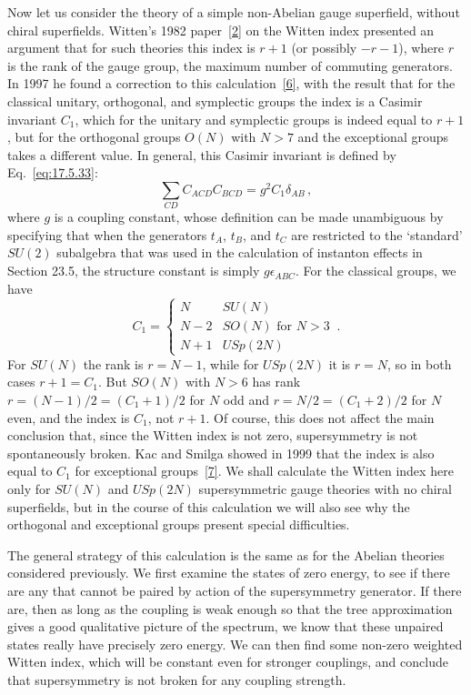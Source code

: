 Now let us consider the theory of a simple non-Abelian gauge superfield,
without chiral superfields. Witten's 1982
paper~\hyperref[ch29-ref-2]{[2]} on the Witten index presented an argument
that for such theories this index is \(r+1\) (or possibly \(-r-1\)), where
\(r\) is the rank of the gauge group, the maximum number of commuting
generators. In 1997 he found a correction to this
calculation~\hyperref[ch29-ref-6]{[6]}, with the result that for the
classical unitary, orthogonal, and symplectic groups the index is a Casimir
invariant \(C_1\), which for the unitary and symplectic groups is indeed
equal to \(r+1\), but for the orthogonal groups \(O(N)\) with \(N>7\) and
the exceptional groups takes a different value. In general, this Casimir
invariant is defined by Eq.~\eqref{eq:17.5.33}:
\begin{equation}
  \sum_{CD}C_{ACD}C_{BCD}=g^2C_1\delta_{AB}\,,
  \tag{29.4.4}\label{eq:29.4.4}
\end{equation}
where \(g\) is a coupling constant, whose definition can be made
unambiguous by specifying that when the generators \(t_A\), \(t_B\), and
\(t_C\) are restricted to the `standard' \(SU(2)\) subalgebra that was used
in the calculation of instanton effects in Section 23.5, the structure
constant is simply \(g\epsilon_{ABC}\). For the classical groups, we have
\begin{equation}
  C_1=
  \begin{cases}
    N   & SU(N)\\
    N-2 & SO(N)\text{ for }N>3\\
    N+1 & USp(2N)
  \end{cases}
  \,.
  \tag{29.4.5}\label{eq:29.4.5}
\end{equation}
For \(SU(N)\) the rank is \(r=N-1\), while for \(USp(2N)\) it is \(r=N\),
so in both cases \(r+1=C_1\). But \(SO(N)\) with \(N>6\) has rank
\(r=(N-1)/2=(C_1+1)/2\) for \(N\) odd and
\(r=N/2=(C_1+2)/2\) for \(N\) even, and the index is \(C_1\), not
\(r+1\). Of course, this does not affect the main conclusion that, since
the Witten index is not zero, supersymmetry is not spontaneously broken.
Kac and Smilga showed in 1999 that the index is also equal to \(C_1\) for
exceptional groups~\hyperref[ch29-ref-7]{[7]}. We shall calculate the
Witten index here only for \(SU(N)\) and \(USp(2N)\) supersymmetric gauge
theories with no chiral superfields, but in the course of this calculation
we will also see why the orthogonal and exceptional groups present special
difficulties.

The general strategy of this calculation is the same as for the Abelian
theories considered previously. We first examine the states of zero energy,
to see if there are any that cannot be paired by action of the supersymmetry
generator. If there are, then as long as the coupling is weak enough so that
the tree approximation gives a good qualitative picture of the spectrum,
we know that these unpaired states really have precisely zero energy. We can
then find some non-zero weighted Witten index, which will be constant even
for stronger couplings, and conclude that supersymmetry is not broken for
any coupling strength.

